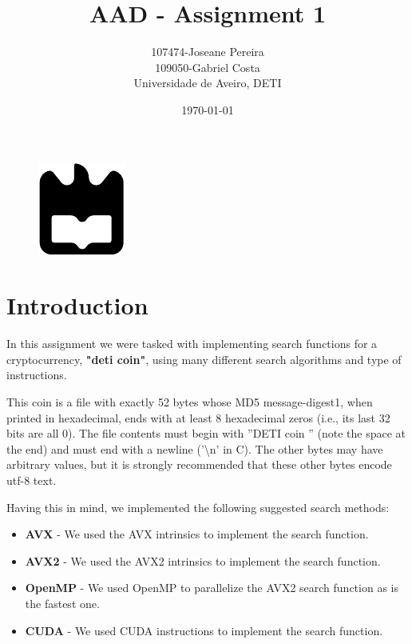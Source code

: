\documentclass[a4paper,12pt]{article}
\title{AAD - Assignment 1}
\author{107474-Joseane Pereira \\
109050-Gabriel Costa \\
Universidade de Aveiro, DETI}
\date{\today}
\begin{document}
\begin{figure}
    \centering
    \includegraphics[width=0.3\linewidth]{ua.pdf}
    \label{fig:enter-label}
\end{figure}
\maketitle
\newpage
\tableofcontents
\newpage

\section{Introduction}
\label{sec:introduction}

In this assignment we were tasked with implementing search functions for a cryptocurrency,
\textbf{"deti coin"}, using many different search algorithms and type of instructions.

This coin is  a file with exactly 52 bytes whose MD5 message-digest1, when printed in hexadecimal,
ends with at least 8 hexadecimal zeros (i.e., its last 32 bits are all 0). The file contents must begin with
”DETI coin ” (note the space at the end) and must end with a newline (’\textbackslash n’ in C). The other bytes may
have arbitrary values, but it is strongly recommended that these other bytes encode utf-8 text. 

Having this in mind, we implemented the following suggested search methods:
\begin{itemize}
    \item \textbf{AVX} - We used the AVX intrinsics to implement the search function.
    \item \textbf{AVX2} - We used the AVX2 intrinsics to implement the search function.
    \item \textbf{OpenMP} - We used OpenMP to parallelize the AVX2 search function as is the fastest one.
    \item \textbf{CUDA} - We used CUDA instructions to implement the search function.
\end{itemize}
\end{document}
